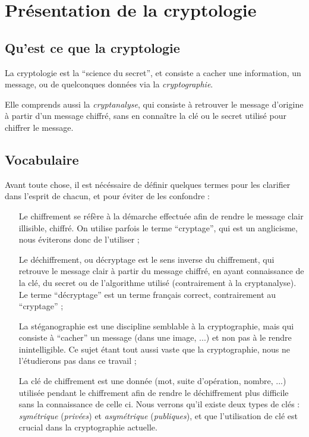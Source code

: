 \chapter{Présentation de la cryptologie}
\section{Qu'est ce que la cryptologie}
La cryptologie est la ``science du secret'', et consiste a cacher une
information, un message, ou de quelconques données via la
\emph{cryptographie}. 

Elle comprends aussi la \emph{cryptanalyse}, qui consiste à retrouver
le message d'origine à partir d'un message chiffré, sans en connaître
la clé ou le secret utilisé pour chiffrer le message.
\section{Vocabulaire\label{s:Definitions}}
Avant toute chose, il est nécéssaire de définir quelques termes pour
les clarifier dans l'esprit de chacun, et pour éviter de les confondre
:
\begin{itemize}
\renewcommand{\makelabel}[1]{\sffamily\textbf{#1}}
\item[Le chiffrement] se réfère à la démarche effectuée afin de rendre
  le message clair illisible, chiffré. On utilise parfois le terme
  ``cryptage'', qui est un anglicisme, nous éviterons donc de
  l'utiliser ;

\item[Le déchiffrement, ou décryptage] est le sens inverse du
  chiffrement, qui retrouve le message clair à partir du message
  chiffré, en ayant connaissance de la clé, du secret ou de
  l'algorithme utilisé (contrairement à la cryptanalyse). Le terme
  ``décryptage'' est un terme français correct, contrairement au
  ``cryptage'' ;

\item[La stéganographie] est une discipline semblable à la
  cryptographie, mais qui consiste à ``cacher'' un message (dans une
  image, ...) et non pas à le rendre inintelligible. Ce sujet étant
  tout aussi vaste que la cryptographie, nous ne l'étudierons pas dans
  ce travail ;

\item[La clé de chiffrement] est une donnée (mot, suite d'opération,
  nombre, ...) utilisée pendant le chiffrement afin de rendre le
  déchiffrement plus difficile sans la connaissance de celle ci.
  Nous verrons qu'il existe deux types de clés : \emph{symétrique}
  (\emph{privées}) et \emph{asymétrique} (\emph{publiques}), et que
  l'utilisation de clé est crucial dans la cryptographie actuelle.
\end{itemize}

